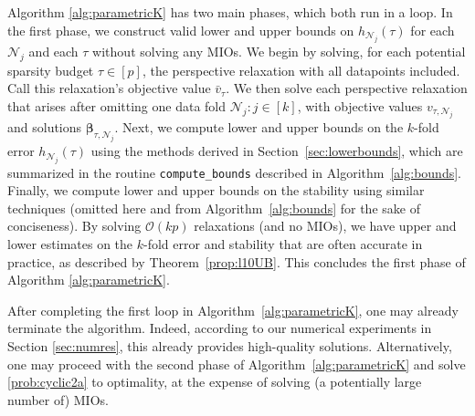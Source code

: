 \documentclass[mnsc,nonblindrev]{informs3} %
\let\footnote=\endnote
\begin{document}

{Algorithm \ref{alg:parametricK} has two main phases, which both run in a loop. In the first phase, we construct valid lower and upper bounds on $h_{\mathcal{N}_j}(\tau)$ for each $\mathcal{N}_j$ and each $\tau$ without solving any MIOs. We begin by solving, for each potential sparsity budget $\tau\in [p]$, the perspective relaxation with all datapoints included. Call this relaxation's objective value $\bar v_{\tau}$. We then solve each perspective relaxation that arises after omitting one data fold $\mathcal{N}_j: j \in [k]$, with objective values $v_{\tau,\mathcal{N}_j}$ and solutions $\bm{\beta}_{\tau,\mathcal{N}_j}$. %
Next, we compute lower and upper bounds on the $k$-fold error $h_{\mathcal{N}_j}(\tau)$ using the methods derived in Section~\ref{sec:lowerbounds}, which are summarized in the routine \texttt{compute\_bounds} described in Algorithm~\ref{alg:bounds}. Finally, we compute lower and upper bounds on the stability using similar techniques (omitted here and from Algorithm~\ref{alg:bounds} for the sake of conciseness). By solving $\mathcal{O}(kp)$ relaxations (and no MIOs), we have upper and lower estimates on the $k$-fold error and stability that are often accurate in practice, as described by Theorem~\ref{prop:l10UB}. This concludes the first phase of Algorithm \ref{alg:parametricK}.

After completing the first loop in Algorithm~\ref{alg:parametricK}, one may already terminate the algorithm. Indeed, according to our numerical experiments in Section \ref{sec:numres}, this already provides high-quality solutions. Alternatively, one may proceed with the second phase of Algorithm~\ref{alg:parametricK} and solve \eqref{prob:cyclic2a} to optimality, at the expense of solving (a potentially large number of) MIOs.

}
\end{document}
